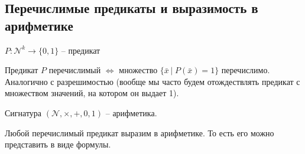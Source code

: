 \subsection{Перечислимые предикаты и выразимость в арифметике}
\begin{conj}
    $P: \mathcal{N}^k \to \{ 0, 1 \}$ -- предикат
\end{conj}
\begin{conj}
    Предикат $P$ перечислимый $\Leftrightarrow$ множество $\{ \bar{x} \, | \; P(\bar{x}) = 1 \}$ перечислимо. Аналогично с разрешимостью (вообще мы часто будем отождествлять предикат с множеством значений, на котором он выдает 1).
\end{conj}
\begin{conj}
    Сигнатура $(\mathcal{N}, \times, +, 0, 1)$ -- арифметика.
\end{conj}
\begin{theorem}
    Любой перечислимый предикат выразим в арифметике. То есть его можно представить в виде формулы.
\end{theorem}
